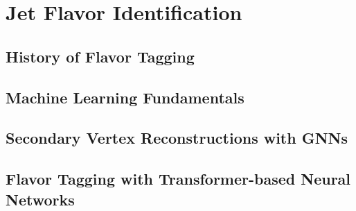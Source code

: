 \chapter{Jet Flavor Identification}

\section{History of Flavor Tagging}

\section{Machine Learning Fundamentals}

\section{Secondary Vertex Reconstructions with GNNs}

\section{Flavor Tagging with Transformer-based Neural Networks}